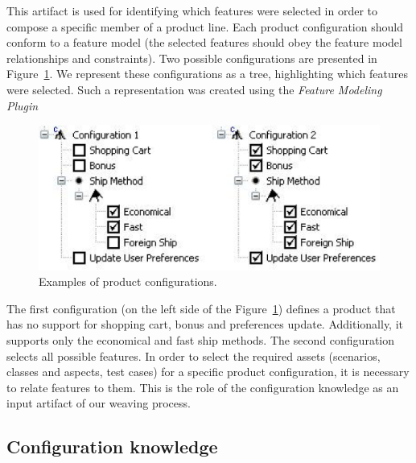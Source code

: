\documentclass[11pt]{report}
\begin{document}
This artifact is used for identifying which features were selected in order to compose a specific member of a product line. Each product configuration should conform to a feature model (the selected features should obey the feature model relationships and constraints). Two possible configurations are presented in Figure~\ref{fig:product-config-01-02}. We represent these configurations as a tree, highlighting which features were selected. Such a representation was created using the \emph{Feature Modeling Plugin}~\cite{czarnecki-eclipse-2004} 

 \begin{figure}[h]
 \begin{center}
  \includegraphics[scale=0.40]{img/pc-03.eps}
    \caption{Examples of product configurations.}
  \label{fig:product-config-01-02}
  \end{center}
\end{figure}

  
The first configuration (on the left side of the Figure~\ref{fig:product-config-01-02}) defines a product that has no support for shopping cart, bonus and preferences update. Additionally, it supports only the economical and fast ship methods. The second configuration selects all possible features. 
In order to select the required assets (scenarios, classes and aspects, test cases) for a specific product configuration, it is necessary to relate features to them. This is the role of the configuration knowledge as an input artifact of our weaving process.  

\subsection{Configuration knowledge}\label{subsub:ck}
\end{document}
